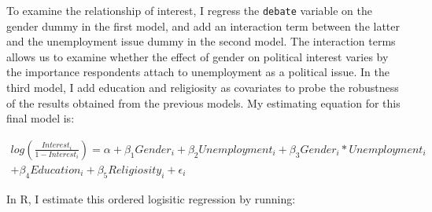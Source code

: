 \documentclass[
]{article}
\begin{document}
To examine the relationship of interest, I regress the \texttt{debate}
variable on the gender dummy in the first model, and add an interaction
term between the latter and the unemployment issue dummy in the second
model. The interaction terms allows us to examine whether the effect of
gender on political interest varies by the importance respondents attach
to unemployment as a political issue. In the third model, I add
education and religiosity as covariates to probe the robustness of the
results obtained from the previous models. My estimating equation for
this final model is:

\[
\begin{aligned}
log(\frac{Interest_{i}}{1-Interest_{i}}) = \alpha + \beta_{1}Gender_{i} +  \beta_{2}Unemployment_{i} + \beta_{3}Gender_{i}*Unemployment_{i} \\ 
+ \beta_{4}Education_{i} + \beta_{5}Religiosity_{i} + \epsilon_{i}
\end{aligned}
\]

In R, I estimate this ordered logisitic regression by running:
\end{document}
